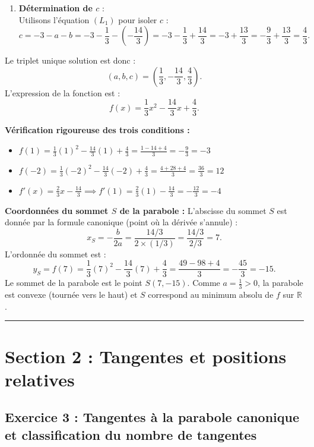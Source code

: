 \documentclass[11pt,a4paper]{article}
\newcommand{\R}{\mathbb{R}}
\begin{document}
\begin{correctionbox}
\begin{enumerate}[label=\textbf{Étape \arabic* :}]
    \item \textbf{Détermination de $c$} :\\
    Utilisons l'équation $(L_1)$ pour isoler $c$ :
    \[
    c = -3 - a - b = -3 - \frac{1}{3} - \left(-\frac{14}{3}\right) = -3 - \frac{1}{3} + \frac{14}{3} = -3 + \frac{13}{3} = -\frac{9}{3} + \frac{13}{3} = \frac{4}{3}.
    \]
\end{enumerate}

Le triplet unique solution est donc :
\[
(a, b, c) = \left(\frac{1}{3}, -\frac{14}{3}, \frac{4}{3}\right).
\]
L'expression de la fonction est :
\[
f(x) = \frac{1}{3}x^2 - \frac{14}{3}x + \frac{4}{3}.
\]

\textbf{Vérification rigoureuse des trois conditions :}
\begin{itemize}
    \item $f(1) = \frac{1}{3}(1)^2 - \frac{14}{3}(1) + \frac{4}{3} = \frac{1 - 14 + 4}{3} = -\frac{9}{3} = -3$ \quad \checkmark
    \item $f(-2) = \frac{1}{3}(-2)^2 - \frac{14}{3}(-2) + \frac{4}{3} = \frac{4 + 28 + 4}{3} = \frac{36}{3} = 12$ \quad \checkmark
    \item $f'(x) = \frac{2}{3}x - \frac{14}{3} \implies f'(1) = \frac{2}{3}(1) - \frac{14}{3} = -\frac{12}{3} = -4$ \quad \checkmark
\end{itemize}

\textbf{Coordonnées du sommet $S$ de la parabole :}
L'abscisse du sommet $S$ est donnée par la formule canonique (point où la dérivée s'annule) :
\[
x_S = -\frac{b}{2a} = \frac{14/3}{2 \times (1/3)} = \frac{14/3}{2/3} = 7.
\]
L'ordonnée du sommet est :
\[
y_S = f(7) = \frac{1}{3}(7)^2 - \frac{14}{3}(7) + \frac{4}{3} = \frac{49 - 98 + 4}{3} = -\frac{45}{3} = -15.
\]
Le sommet de la parabole est le point $S(7, -15)$. Comme $a = \frac{1}{3} > 0$, la parabole est convexe (tournée vers le haut) et $S$ correspond au minimum absolu de $f$ sur $\R$.
\end{correctionbox}


\vspace{1cm}
\hrule
\vspace{1cm}
\section{Section 2 : Tangentes et positions relatives}

\subsection*{Exercice 3 : Tangentes à la parabole canonique et classification du nombre de tangentes}
\end{document}
